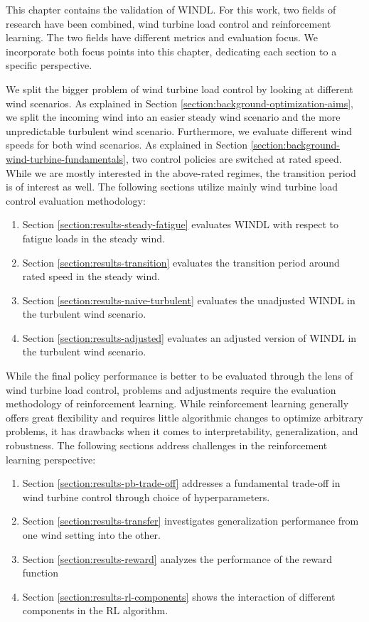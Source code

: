 \label{ch:results}

This chapter contains the validation of \ac{WINDL}. For this work, two fields of research have been combined, wind turbine load control and reinforcement learning. The two fields have different metrics and evaluation focus. We incorporate both focus points into this chapter, dedicating each section to a specific perspective.

We split the bigger problem of wind turbine load control by looking at different wind scenarios. As explained in Section \ref{section:background-optimization-aims}, we split the incoming wind into an easier steady wind scenario and the more unpredictable turbulent wind scenario. Furthermore, we evaluate different wind speeds for both wind scenarios. As explained in Section \ref{section:background-wind-turbine-fundamentals}, two control policies are switched at rated speed. While we are mostly interested in the above-rated regimes, the transition period is of interest as well. The following sections utilize mainly wind turbine load control evaluation methodology:

\begin{enumerate}
  \item Section \ref{section:results-steady-fatigue} evaluates \ac{WINDL} with respect to fatigue loads in the steady wind.
  \item Section \ref{section:results-transition} evaluates the transition period around rated speed in the steady wind.
  \item Section \ref{section:results-naive-turbulent} evaluates the unadjusted \ac{WINDL} in the turbulent wind scenario.
  \item Section \ref{section:results-adjusted} evaluates an adjusted version of \ac{WINDL} in the turbulent wind scenario.
\end{enumerate}

While the final policy performance is better to be evaluated through the lens of wind turbine load control, problems and adjustments require the evaluation methodology of reinforcement learning. While reinforcement learning generally offers great flexibility and requires little algorithmic changes to optimize arbitrary problems, it has drawbacks when it comes to interpretability, generalization, and robustness. The following sections address challenges in the reinforcement learning perspective:

\begin{enumerate}
  \item Section \ref{section:results-pb-trade-off} addresses a fundamental trade-off in wind turbine control through choice of hyperparameters.
  \item Section \ref{section:results-transfer} investigates generalization performance from one wind setting into the other.
  \item Section \ref{section:results-reward} analyzes the performance of the reward function
  \item Section \ref{section:results-rl-components} shows the interaction of different components in the RL algorithm.
\end{enumerate}



